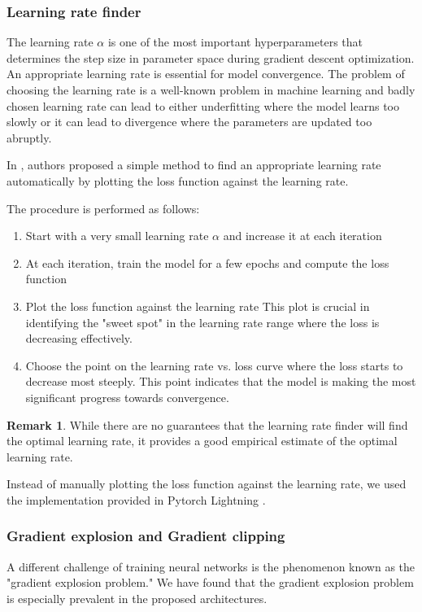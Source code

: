 \documentclass[a4paper, twoside]{report}
\theoremstyle{definition}
\newtheorem{remark}[theorem]{Remark}
\numberwithin{equation}{section}
\begin{document}
\subsubsection{Learning rate finder} \label{sec:learning_rate_finder}

The learning rate $\alpha$ is one of the most important hyperparameters that determines the step size in parameter space
during gradient descent optimization. An appropriate learning rate is essential for
model convergence.
The problem of choosing the learning rate is a well-known problem in machine learning
and badly chosen learning rate can lead to either underfitting where the model
learns too slowly or it can lead to divergence where the parameters are updated too abruptly.

In \cite{1506.01186}, authors proposed a simple method to find an appropriate learning rate
automatically by plotting the loss function against the learning rate.

The procedure is performed as follows:
\begin{enumerate}
    \item Start with a very small learning rate $\alpha$ and increase it at each iteration
    \item At each iteration, train the model for a few epochs and compute the loss function
    \item Plot the loss function against the learning rate
          This plot is crucial in identifying the "sweet spot" in the learning rate range
          where the loss is decreasing effectively.
    \item Choose the point on the learning rate vs. loss curve where the
          loss starts to decrease most steeply.  This point indicates that the model
          is making the most significant progress towards convergence.
\end{enumerate}

\begin{remark}
    While there are no guarantees that the learning rate finder will find the optimal learning rate,
    it provides a good empirical estimate of the optimal learning rate.
\end{remark}

Instead of manually plotting the loss function against the learning rate, we used the implementation
provided in Pytorch Lightning \cite{lightning.ai_2023_lr_finder}.


\subsubsection{Gradient explosion and Gradient clipping} \label{sec:gradient_clipping}
A different challenge of training neural networks is the phenomenon known as the "gradient explosion problem."
We have found that the gradient explosion problem is especially prevalent in the proposed architectures.
\end{document}
